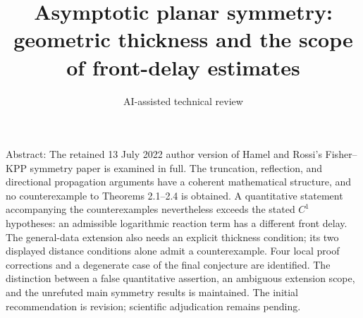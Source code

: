 \documentclass[10pt]{article}
\title{Asymptotic planar symmetry: geometric thickness and the scope of front-delay estimates}
\author{AI-assisted technical review}
\date{}
\begin{document}
\maketitle
Abstract: The retained 13 July 2022 author version of Hamel and Rossi’s Fisher–KPP symmetry paper is examined in full. The truncation, reflection, and directional propagation arguments have a coherent mathematical structure, and no counterexample to Theorems 2.1–2.4 is obtained. A quantitative statement accompanying the counterexamples nevertheless exceeds the stated \(C^1\) hypotheses: an admissible logarithmic reaction term has a different front delay. The general-data extension also needs an explicit thickness condition; its two displayed distance conditions alone admit a counterexample. Four local proof corrections and a degenerate case of the final conjecture are identified. The distinction between a false quantitative assertion, an ambiguous extension scope, and the unrefuted main symmetry results is maintained. The initial recommendation is revision; scientific adjudication remains pending.\par
\end{document}
